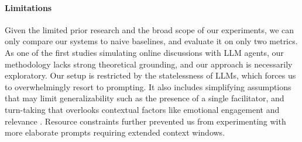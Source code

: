 %
\paragraph{Limitations} 
Given the limited prior research and the broad scope of our experiments, we can only compare our systems to naive baselines, and evaluate it on only two metrics. As one of the first studies simulating online discussions with LLM agents, our methodology lacks strong theoretical grounding, and our approach is necessarily exploratory. Our setup is restricted by the statelessness of LLMs, which forces us to overwhelmingly resort to prompting. It also includes simplifying assumptions that may limit generalizability such as the presence of a single facilitator, and turn-taking that overlooks contextual factors like emotional engagement and relevance \cite{robert_2016_comment, Ziegele03102018}. Resource constraints further prevented us from experimenting with more elaborate prompts requiring extended context windows.

